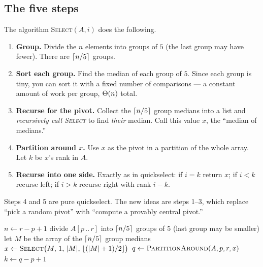\subsection{The five steps}

The algorithm \textsc{Select}$(A, i)$ does the following.

\begin{enumerate}
  \item \textbf{Group.} Divide the $n$ elements into groups of $5$ (the last group
    may have fewer). There are $\lceil n/5\rceil$ groups.
  \item \textbf{Sort each group.} Find the median of each group of $5$. Since each
    group is tiny, you can sort it with a fixed number of comparisons --- a
    constant amount of work per group, $\Theta(n)$ total.
  \item \textbf{Recurse for the pivot.} Collect the $\lceil n/5\rceil$ group medians into
    a list and \emph{recursively call \textsc{Select}} to find \emph{their} median.
    Call this value $x$, the ``median of medians.''
  \item \textbf{Partition around $x$.} Use $x$ as the pivot in a partition of the
    whole array. Let $k$ be $x$'s rank in $A$.
  \item \textbf{Recurse into one side.} Exactly as in quickselect: if $i = k$
    return $x$; if $i < k$ recurse left; if $i > k$ recurse right with rank
    $i - k$.
\end{enumerate}

Steps 4 and 5 are pure quickselect. The new ideas are steps 1--3, which replace
``pick a random pivot'' with ``compute a provably central pivot.''

\begin{algorithm}[H]
\caption{\textsc{Select}$(A, p, r, i)$ -- deterministic, worst-case linear}\label{ch09:alg-select}
$n \gets r - p + 1$\;
divide $A[p\,..\,r]$ into $\lceil n/5\rceil$ groups of $5$ (last group may be smaller)\;
let $M$ be the array of the $\lceil n/5\rceil$ group medians\;
$x \gets \textsc{Select}\big(M,\, 1,\, \lvert M\rvert,\, \lfloor(\lvert M\rvert+1)/2\rfloor\big)$ 
$q \gets \textsc{PartitionAround}(A, p, r, x)$ 
$k \gets q - p + 1$\;
\end{algorithm}

